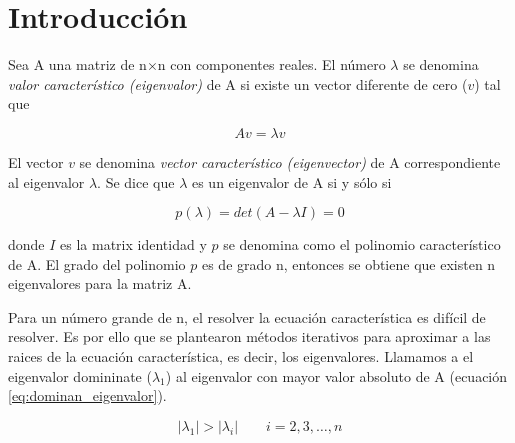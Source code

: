 \section{Introducción}

Sea A una matriz de n$\times$n con componentes reales. El número $\lambda$ se denomina \textit{valor característico (eigenvalor)} de A si existe un vector diferente de cero ($v$) tal que

\begin{equation}
    Av = \lambda v \label{eq:equation_eigenvalores}
\end{equation}

El vector $v$ se denomina \textit{vector característico (eigenvector)} de A correspondiente al eigenvalor $\lambda$. Se dice que $\lambda$ es un eigenvalor de A si y sólo si

\begin{equation}
    p(\lambda) = det(A - \lambda I) = 0 \label{eq:polinomio}
\end{equation}

donde $I$ es la matrix identidad y $p$ se denomina como el polinomio característico de A. El grado del polinomio $p$ es de grado n, entonces se obtiene que existen n eigenvalores para la matriz A.

Para un número grande de n, el resolver la ecuación característica es difícil de resolver. Es por ello que se plantearon métodos iterativos para aproximar a las raices de la ecuación característica, es decir, los eigenvalores. Llamamos a el eigenvalor domininate ($\lambda_1$) al eigenvalor con mayor valor absoluto de A (ecuación \ref{eq:dominan_eigenvalor}).

\begin{equation}
    |\lambda_1| > |\lambda_i| \qquad i=2,3,\dots,n \label{eq:dominan_eigenvalor}
\end{equation}